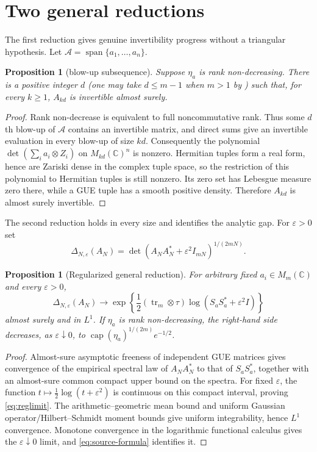 \documentclass[11pt]{article}
\newtheorem{proposition}[theorem]{Proposition}
\newcommand{\C}{\mathbb C}
\newcommand{\tr}{\operatorname{tr}}
\newcommand{\capc}{\operatorname{cap}}
\newcommand{\D}{\Delta}
\begin{document}
\section{Two general reductions}

The first reduction gives genuine invertibility progress without a triangular
hypothesis.  Let $\mathcal A=\operatorname{span}\{a_1,\ldots,a_n\}$.

\begin{proposition}[blow-up subsequence]\label{prop:blowup}
Suppose $\eta_a$ is rank non-decreasing.  There is a positive integer $d$
(one may take $d\leq m-1$ when $m>1$ by \cite{DM}) such that, for every
$k\geq1$, $A_{kd}$ is invertible almost surely.
\end{proposition}

\begin{proof}
Rank non-decrease is equivalent to full noncommutative rank.  Thus some
$d$th blow-up of $\mathcal A$ contains an invertible matrix, and direct sums
give an invertible evaluation in every blow-up of size $kd$.  Consequently
the polynomial
$\det(\sum_i a_i\otimes Z_i)$ on $M_{kd}(\C)^n$ is nonzero.  Hermitian tuples
form a real form, hence are Zariski dense in the complex tuple space, so the
restriction of this polynomial to Hermitian tuples is still nonzero.  Its zero
set has Lebesgue measure zero there, while a GUE tuple has a smooth positive
density.  Therefore $A_{kd}$ is almost surely invertible.
\end{proof}

The second reduction holds in every size and identifies the analytic gap.
For $\varepsilon>0$ set
\[
 \D_{N,\varepsilon}(A_N)
 =\det(A_NA_N^*+\varepsilon^2I_{mN})^{1/(2mN)}.
\]

\begin{proposition}[Regularized general reduction]\label{prop:regularized}
For arbitrary fixed $a_i\in M_m(\C)$ and every $\varepsilon>0$,
\begin{equation}\label{eq:reglimit}
 \D_{N,\varepsilon}(A_N)\longrightarrow
 \exp\!\left\{\frac12(\tr_m\otimes\tau)
 \log(S_aS_a^*+\varepsilon^2I)\right\}
\end{equation}
almost surely and in $L^1$.  If $\eta_a$ is rank non-decreasing, the
right-hand side decreases, as $\varepsilon\downarrow0$, to
$\capc(\eta_a)^{1/(2m)}e^{-1/2}$.
\end{proposition}

\begin{proof}
Almost-sure asymptotic freeness of independent GUE matrices gives convergence
of the empirical spectral law of $A_NA_N^*$ to that of $S_aS_a^*$, together
with an almost-sure common compact upper bound on the spectra.  For fixed
$\varepsilon$, the function $t\mapsto\frac12\log(t+\varepsilon^2)$ is
continuous on this compact interval, proving \eqref{eq:reglimit}.  The
arithmetic--geometric mean bound and uniform Gaussian operator/Hilbert--Schmidt
moment bounds give uniform integrability, hence $L^1$ convergence.  Monotone
convergence in the logarithmic functional calculus gives the
$\varepsilon\downarrow0$ limit, and \eqref{eq:source-formula} identifies it.
\end{proof}
\end{document}
